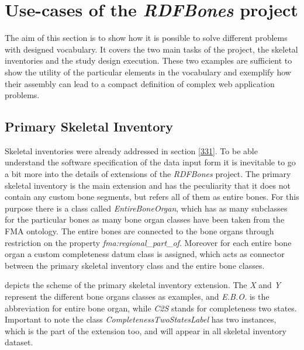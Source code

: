 
\section{Use-cases of the \textit{RDFBones} project}

The aim of this section is to show how it is possible to solve different problems with designed vocabulary. It covers the two main tasks of the project, the skeletal inventories and the study design execution. These two examples are sufficient to show the utility of the particular elements in the vocabulary and exemplify how their assembly can lead to a compact definition of complex web application problems. 

\subsection{Primary Skeletal Inventory}

Skeletal inventories were already addressed in section \ref{331}. To be able understand the software specification of the data input form it is inevitable to go a bit more into the details of extensions of the \textit{RDFBones} project. The primary skeletal inventory is the main extension and has the peculiarity that it does not contain any custom bone segments, but refers all of them as entire bones. For this purpose there is a class called \textit{EntireBoneOrgan}, which has as many subclasses for the particular bones as many bone organ classes have been taken from the FMA ontology. The entire bones are connected to the bone organs through restriction on the property \textit{fma:regional\_part\_of}. Moreover for each entire bone organ a custom completeness datum class is assigned, which acts as connector between the primary skeletal inventory class and the entire bone classes. 


 depicts the scheme of the primary skeletal inventory extension. The \textit{X} and \textit{Y} represent the different bone organs classes as examples, and \textit{E.B.O.} is the abbreviation for entire bone organ, while \textit{C2S} stands for completeness two states. Important to note the class \textit{CompletenessTwoStatesLabel}  has two instances, which is the part of the extension too, and will appear in all skeletal inventory dataset.

